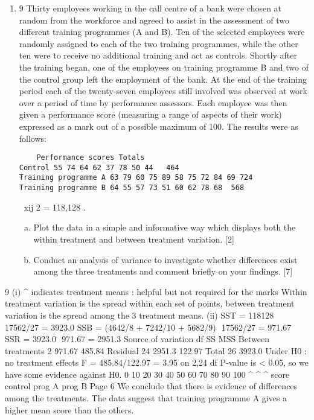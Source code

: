 \documentclass[a4paper,12pt]{article}
\begin{document}
\begin{enumerate}
\item 9 Thirty employees working in the call centre of a bank were chosen at random from
the workforce and agreed to assist in the assessment of two different training
programmes (A and B).
Ten of the selected employees were randomly assigned to each of the two training
programmes, while the other ten were to receive no additional training and act as
controls.
Shortly after the training began, one of the employees on training programme B and
two of the control group left the employment of the bank.
At the end of the training period each of the twenty-seven employees still involved
was observed at work over a period of time by performance assessors. Each
employee was then given a performance score (measuring a range of aspects of their
work) expressed as a mark out of a possible maximum of 100.
The results were as follows:
\begin{verbatim}
    Performance scores Totals
Control 55 74 64 62 37 78 50 44   464
Training programme A 63 79 60 75 89 58 75 72 84 69 724
Training programme B 64 55 57 73 51 60 62 78 68  568

\end{verbatim}
xij
2 = 118,128 .
\begin{enumerate}[(a)]
\item Plot the data in a simple and informative way which displays both the within
treatment and between treatment variation. [2]
\item  Conduct an analysis of variance to investigate whether differences exist
among the three treatments and comment briefly on your findings. [7]
\end{enumerate}


\end{enumerate}

9 (i)
^ indicates treatment means : helpful but not required for the marks
Within treatment variation is the spread within each set of points, between
treatment variation is the spread among the 3 treatment means.
(ii) SST = 118128  17562/27 = 3923.0
SSB = (4642/8 + 7242/10 + 5682/9)  17562/27 = 971.67
 SSR = 3923.0  971.67 = 2951.3
Source of variation df SS MSS
Between treatments 2 971.67 485.84
Residual 24 2951.3 122.97
Total 26 3923.0
Under H0 : no treatment effects F = 485.84/122.97 = 3.95 on 2,24 df
P-value is < 0.05, so we have some evidence against H0.
0 10 20 30 40 50 60 70 80 90 100
^
^
^
score
control
prog A
prog B
Page 6
We conclude that there is evidence of differences among the treatments. The
data suggest that training programme A gives a higher mean score than the
others.
\end{document}

